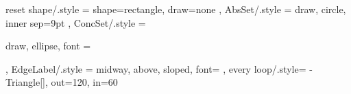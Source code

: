 \newcommand{\appref}[1]{Appendix \ref{#1}}
\newcommand{\fnref}[1]{Footnote \ref{#1}}

\setlength{\epigraphwidth}{.618\textwidth}%
\tikzset
  {
    reset shape/.style = {
      shape=rectangle,
      draw=none
    },
    AbsSet/.style = {
      draw,
      circle,
      inner sep=9pt
    },
    ConcSet/.style = {
      draw,
      ellipse,
      font = {\itshape\strut}
    },
    EdgeLabel/.style = {
      midway,
      above,
      sloped,
      font=\small
    },
    every loop/.style={
        -{Triangle[]},
        out=120,
        in=60
    }
  }%

\newenvironment{langscibars}{\begin{axis}[ybar,xtick=data, xticklabels from table={\mydata}{pos},
        width  = \textwidth,
	height = .3\textheight,
    	nodes near coords,
	xtick=data,
	x tick label style={},
	ymin=0,
        ]}{\end{axis}}

\newcommand{\langscibar}[1]{\addplot+ table [x=i, y=#1] {\mydata};\addlegendentry{#1};}

\newcommand{\langscidata}[1]{\pgfplotstableread{#1}\mydata;}


\newcommand{\textstylePhono}[1]{#1}
\newcommand{\textstylePhonoApprofondissement}[1]{#1}
\newcommand{\textstylest}[1]{#1}
\newcommand{\textstyleTermes}[1]{\textsc{#1}}
\newcommand{\textstyleTermesapprof}[1]{\textsc{#1}}
\newcommand{\textstyleTermesapprofondissement}[1]{\textsc{#1}}

\newenvironment{styleExemplesuite}{}{}
\newenvironment{styleillustrationAFaire}{\begin{exe}\ex}{\end{exe}} %

\newenvironment{styleLivreImportant}{
\begin{mdframed}[style=tblsfilledbox,frametitle={}]
}{
\end{mdframed}
}

\newenvironment{styleTitreChapitre}{}{}
\newenvironment{styleTitrePartie}{}{}
\newenvironment{styleTitreSection}{}{}
\newenvironment{styleTitreSousSection}{}{}

\newenvironment{styleaprofondissementInterTitre}{\color{red}}{}

\newcommand{\gkchapter}[2]{#1: #2}
\newcommand{\gkboxsection}[3]{\section{#2~\texttt{[image: figures/gk-\#1.pdf]}}
    \marginpar{\texttt{[image: figures/gk-\#1.pdf]}}#3
    }
\renewcommand{\gkboxsection}[3]{\section{#2}#3}
\newcommand{\encadref}[1]{encadré~\ref{#1}}

